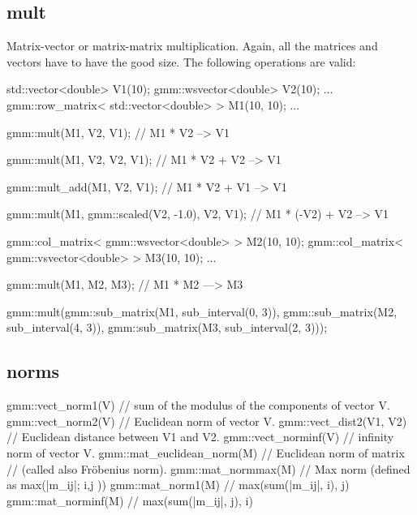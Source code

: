 \documentclass[11pt,a4paper]{article}
\begin{document}
\subsection{mult}
 
Matrix-vector or matrix-matrix multiplication. Again, all the matrices and vectors have to have the good size. The following operations are valid:
\begin{cppcode}
  std::vector<double> V1(10);
  gmm::wsvector<double> V2(10);
  ...
  gmm::row_matrix< std::vector<double> > M1(10, 10);
  ...

  gmm::mult(M1, V2, V1);  // M1 * V2 --> V1

  gmm::mult(M1, V2, V2, V1);  // M1 * V2 + V2 --> V1

  gmm::mult_add(M1, V2, V1);  // M1 * V2 + V1 --> V1

  gmm::mult(M1, gmm::scaled(V2, -1.0), V2, V1);  // M1 * (-V2) + V2 --> V1

  gmm::col_matrix< gmm::wsvector<double> > M2(10, 10);
  gmm::col_matrix< gmm::vsvector<double> > M3(10, 10);
  ...
  
  gmm::mult(M1, M2, M3); // M1 * M2 ---> M3
  
  gmm::mult(gmm::sub_matrix(M1, sub_interval(0, 3)),
            gmm::sub_matrix(M2, sub_interval(4, 3)),
            gmm::sub_matrix(M3, sub_interval(2, 3)));

\end{cppcode}

\subsection{norms}

\begin{cppcode}
  gmm::vect_norm1(V)  // sum of the modulus of the components of vector V.\\
  gmm::vect_norm2(V)  // Euclidean norm of vector V.
  gmm::vect_dist2(V1, V2)  // Euclidean distance between V1 and V2.
  gmm::vect_norminf(V)    // infinity norm of vector V.
  gmm::mat_euclidean_norm(M) // Euclidean norm of matrix 
                             // (called also Fr\"obenius norm).
  gmm::mat_normmax(M) // Max norm (defined as max(|m_ij|; i,j ))
  gmm::mat_norm1(M)   // max(sum(|m_ij|, i), j)
  gmm::mat_norminf(M) // max(sum(|m_ij|, j), i)

\end{cppcode}
\end{document}
